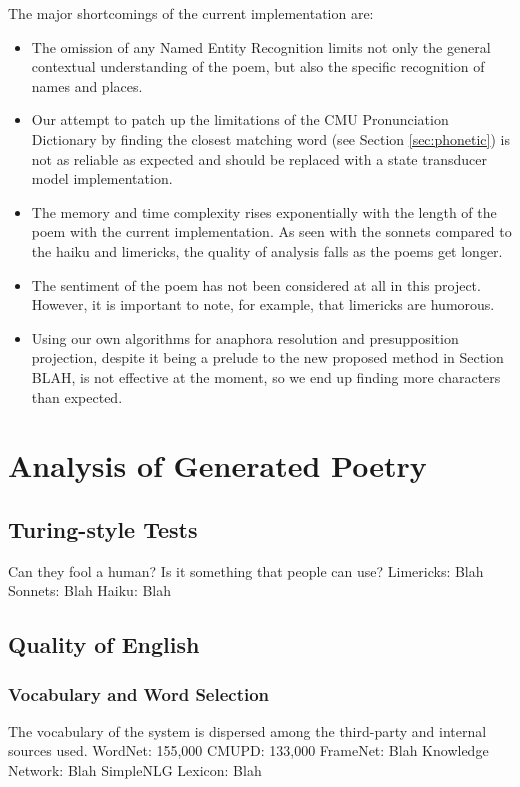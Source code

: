 The major shortcomings of the current implementation are:
\begin{itemize}
\item{The omission of any Named Entity Recognition limits not only the general contextual understanding of the poem, but also the specific recognition of names and places.}
\item{Our attempt to patch up the limitations of the CMU Pronunciation Dictionary by finding the closest matching word (see Section \ref{sec:phonetic}) is not as reliable as expected and should be replaced with a state transducer model implementation.}
\item{The memory and time complexity rises exponentially with the length of the poem with the current implementation. As seen with the sonnets compared to the haiku and limericks, the quality of analysis falls as the poems get longer.}
\item{The sentiment of the poem has not been considered at all in this project. However, it is important to note, for example, that limericks are humorous.}
\item{Using our own algorithms for anaphora resolution and presupposition projection, despite it being a prelude to the new proposed method in Section BLAH, is not effective at the moment, so we end up finding more characters than expected.}
\end{itemize}


\section{Analysis of Generated Poetry}


\subsection{Turing-style Tests}
Can they fool a human?
Is it something that people can use?
Limericks: Blah
Sonnets: Blah
Haiku: Blah


\subsection{Quality of English}

\subsubsection{Vocabulary and Word Selection}
The vocabulary of the system is dispersed among the third-party and internal sources used.
WordNet: 155,000
CMUPD: 133,000
FrameNet: Blah
Knowledge Network: Blah
SimpleNLG Lexicon: Blah

